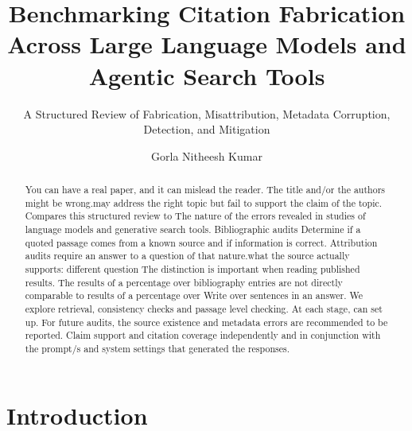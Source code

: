 \documentclass[acmsmall,screen,nonacm]{acmart}
\title{Benchmarking Citation Fabrication Across Large Language Models and Agentic Search Tools}
\subtitle{A Structured Review of Fabrication, Misattribution, Metadata Corruption, Detection, and Mitigation}
\author{Gorla Nitheesh Kumar}
\affiliation{\institution{Indian Institute of Information Technology Allahabad}\department{Department of Information Technology}\city{Prayagraj}\state{Uttar Pradesh}\country{India}}
\begin{document}
\begin{abstract}
You can have a real paper, and it can mislead the reader. The title and/or the authors might be wrong.may address the right topic but fail to support the claim of the topic. Compares this structured review to The nature of the errors revealed in studies of language models and generative search tools. Bibliographic audits Determine if a quoted passage comes from a known source and if information is correct. Attribution audits require an answer to a question of that nature.what the source actually supports: different question The distinction is important when reading published results. The results of a percentage over bibliography entries are not directly comparable to results of a percentage over Write over sentences in an answer. We explore retrieval, consistency checks and passage level checking. At each stage, can set up. For future audits, the source existence and metadata errors are recommended to be reported. Claim support and citation coverage independently and in conjunction with the prompt/s and system settings that generated the responses.
\end{abstract}
\maketitle
\section{Introduction}
\end{document}
